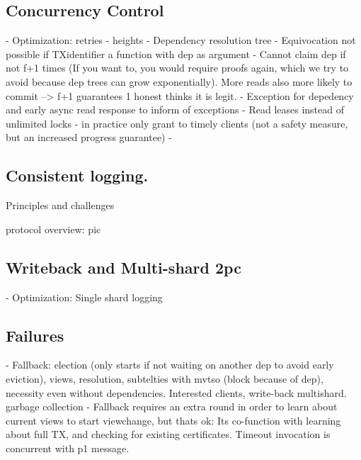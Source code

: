 \subsection{Concurrency Control}
 - Optimization: retries - heights
 - Dependency resolution tree
 		- Equivocation not possible if TXidentifier a function with dep as argument
 		- Cannot claim dep if not f+1 times (If you want to, you would require proofs again, which we try to avoid because dep trees can grow exponentially). More reads also more likely to commit --> f+1 guarantees 1 honest thinks it is legit.
 - Exception for depedency and early async read response to inform of exceptions
 - Read leases instead of unlimited locks - in practice only grant to timely clients (not a safety measure, but an increased progress guarantee)
 - 
\subsection{Consistent logging.}
Principles and challenges

protocol overview: pic


\subsection{Writeback and Multi-shard 2pc}

- Optimization: Single shard logging
\subsection{Failures}
- Fallback: election (only starts if not waiting on another dep to avoid early eviction), views, resolution, subtelties with mvtso (block because of dep), necessity even without dependencies. Interested clients, write-back multishard. garbage collection
- Fallback requires an extra round in order to learn about current views to start viewchange, but thats ok: Its co-function with learning about full TX, and checking for existing certificates. Timeout invocation is concurrent with p1 message.

